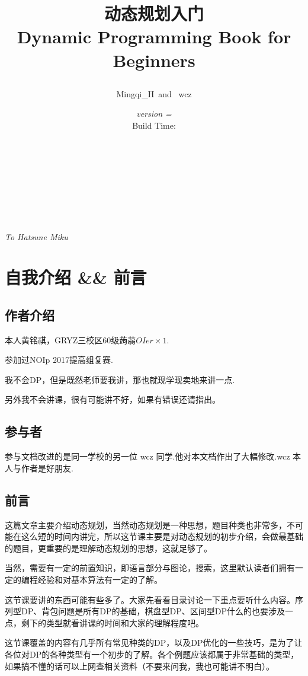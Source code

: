 
\bumprevis
\title{\Huge 动态规划入门\\\Large Dynamic Programming Book for Beginners\\\author{Mingqi\_H\ and \ wcz}\date{\emph{version = \ver\\}Build Time: \DTMnow}}
\maketitle

\thispagestyle{empty}%
\pagestyle{empty}%

\ \\
\ \\
\ \\
\newpage
\ \\\ \\
\begin{center}\em{\large{To Hatsune Miku}}\end{center}
\newpage
\tableofcontents
\newpage

\pagestyle{plain}%
\setcounter{page}{1}
\setcounter{section}{-1}

\section{自我介绍 \&\& 前言}
\subsection{作者介绍}
本人黄铭祺，GRYZ三校区60级蒟蒻$OIer\times 1$.

参加过NOIp 2017提高组复赛.

我不会DP，但是既然老师要我讲，那也就现学现卖地来讲一点.

另外我不会讲课，很有可能讲不好，如果有错误还请指出。
\subsection{参与者}
参与文档改进的是同一学校的另一位 wcz 同学.他对本文档作出了大幅修改.wcz 本人与作者是好朋友.

\subsection{前言}
这篇文章主要介绍动态规划，当然动态规划是一种思想，题目种类也非常多，不可能在这么短的时间内讲完，所以这节课主要是对动态规划的初步介绍，会做最基础的题目，更重要的是理解动态规划的思想，这就足够了。

当然，需要有一定的前置知识，即语言部分与图论，搜索，这里默认读者们拥有一定的编程经验和对基本算法有一定的了解。

这节课要讲的东西可能有些多了。大家先看看目录讨论一下重点要听什么内容。序列型DP、背包问题是所有DP的基础，棋盘型DP、区间型DP什么的也要涉及一点，剩下的类型就看讲课的时间和大家的理解程度吧。

这节课覆盖的内容有几乎所有常见种类的DP，以及DP优化的一些技巧，是为了让各位对DP的各种类型有一个初步的了解。各个例题应该都属于非常基础的类型，如果搞不懂的话可以上网查相关资料（不要来问我，我也可能讲不明白）。


\newpage
